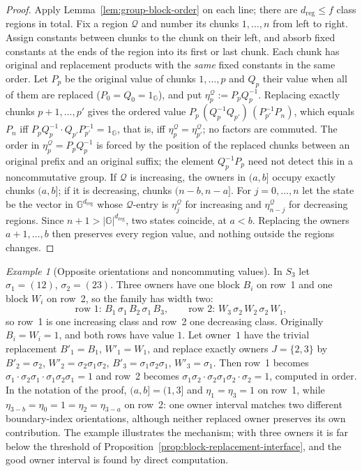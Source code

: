 \documentclass[11pt]{article}
\numberwithin{equation}{section}
\theoremstyle{plain}
\theoremstyle{definition}
\theoremstyle{remark}
\newtheorem{example}[theorem]{Example}
\theoremstyle{plain}
\begin{document}
\begin{proof}
Apply Lemma~\ref{lem:group-block-order} on each line; there are
$d_{\mathrm{reg}}\le f$ class regions in total.  Fix a region $\mathcal Q$ and number its chunks $1,\ldots,n$ from
left to right.  Assign constants between chunks to the chunk on their left,
and absorb fixed constants at the ends of the region into its first or last
chunk.  Each chunk has original and replacement products with the \emph{same}
fixed constants in the same order.  Let $P_p$ be the original value of chunks $1,\ldots,p$ and $Q_p$ their value
when all of them are replaced ($P_0=Q_0=1_{\mathbb G}$), and put
$\eta^{\mathcal Q}_p:=P_pQ_p^{-1}$.  Replacing exactly chunks $p+1,\ldots,p'$ gives
the ordered value $P_p\,(Q_p^{-1}Q_{p'})\,(P_{p'}^{-1}P_n)$, which equals $P_n$
iff $P_pQ_p^{-1}\cdot Q_{p'}P_{p'}^{-1}=1_{\mathbb G}$, that is, iff
$\eta^{\mathcal Q}_p=\eta^{\mathcal Q}_{p'}$; no factors are commuted.  The
order in $\eta^{\mathcal Q}_p=P_pQ_p^{-1}$ is forced by the position of the
replaced chunks between an original prefix and an original suffix; the
element $Q_p^{-1}P_p$ need not detect this in a noncommutative group.  If
$\mathcal Q$ is increasing, the owners in $(a,b]$ occupy exactly chunks $(a,b]$; if it
is decreasing, chunks $(n-b,n-a]$.  For $j=0,\ldots,n$ let the state be the vector in
${\mathbb G}^{d_{\mathrm{reg}}}$ whose $\mathcal Q$-entry is $\eta^{\mathcal Q}_j$ for increasing and
$\eta^{\mathcal Q}_{n-j}$ for decreasing regions.  Since $n+1>|{\mathbb G}|^{d_{\mathrm{reg}}}$, two states
coincide, at $a<b$.  Replacing the owners $a+1,\ldots,b$ then preserves every region
value, and nothing outside the regions changes.
\end{proof}

\begin{example}[Opposite orientations and noncommuting values]
\label{ex:nonabelian-reverse-owner}
In $S_3$ let $\sigma_1=(12)$, $\sigma_2=(23)$.  Three owners have one block $B_i$ on
row~1 and one block $W_i$ on row~2, so the family has width two:
\[
 \text{row 1: }B_1\,\sigma_1\,B_2\,\sigma_1\,B_3,\qquad
 \text{row 2: }W_3\,\sigma_2\,W_2\,\sigma_2\,W_1,
\]
so row~1 is one increasing class and row~2 one decreasing class.  Originally
$B_i=W_i=1$, and both rows have value $1$.  Let owner~$1$ have the
trivial replacement $B'_1=B_1$, $W'_1=W_1$, and replace exactly owners
$J=\{2,3\}$ by $B'_2=\sigma_2$, $W'_2=\sigma_2\sigma_1\sigma_2$, $B'_3=\sigma_1\sigma_2\sigma_1$,
$W'_3=\sigma_1$.  Then row~1 becomes
$\sigma_1\cdot\sigma_2\sigma_1\cdot\sigma_1\sigma_2\sigma_1=1$ and row~2 becomes
$\sigma_1\sigma_2\cdot\sigma_2\sigma_1\sigma_2\cdot\sigma_2=1$, computed in order.  In the notation
of the proof, $(a,b]=(1,3]$ and $\eta_1=\eta_3=1$ on row~1, while
$\eta_{3-b}=\eta_0=1=\eta_2=\eta_{3-a}$ on row~2: one owner interval matches
two different boundary-index orientations, although neither replaced owner
preserves its own contribution.  The example illustrates the mechanism; with
three owners it is far below the threshold of Proposition~\ref{prop:block-replacement-interface},
and the good owner interval is found by direct computation.
\end{example}
\end{document}
